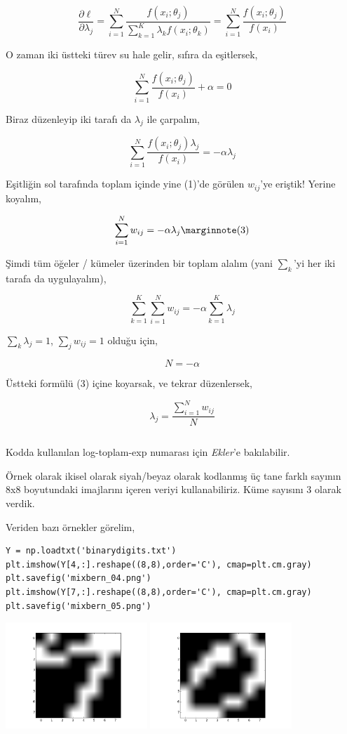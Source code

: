 \documentclass[12pt,fleqn]{article}\usepackage{../../common}
\begin{document}
$$ 
\frac{\partial \ell}{\partial \lambda_j}  = 
\sum_{i=1}^{N}
\frac{f(x_i;\theta_j)}{\sum_{k=1}^{K} \lambda_k f(x_i;\theta_k) }
=
\sum_{i=1}^{N}
\frac{f(x_i;\theta_j)}{f(x_i) }
$$

O zaman iki üstteki türev su hale gelir, sıfıra da eşitlersek,

$$  
\sum_{i=1}^{N} \frac{f(x_i;\theta_j)}{f(x_i) } + \alpha = 0
$$

Biraz düzenleyip iki tarafı da $\lambda_j$ ile çarpalım,

$$
\sum_{i=1}^{N} \frac{f(x_i;\theta_j) \lambda_j}{f(x_i) } = - \alpha \lambda_j 
$$

Eşitliğin sol tarafında toplam içinde yine (1)'de görülen $w_{ij}$'ye eriştik!
Yerine koyalım,

$$
\sum_{i=1}^{N} w_{ij} = - \alpha \lambda_j 
\mlabel{3} 
$$

Şimdi tüm öğeler / kümeler üzerinden bir toplam alalım (yani $\sum_k$'yi her iki
tarafa da uygulayalım),

$$
\sum_{k=1}^{K} \sum_{i=1}^{N} w_{ij} = - \alpha  \sum_{k=1}^{K} \lambda_j
$$


$ \sum_k \lambda_j = 1 $, $\sum_j w_{ij} = 1 $ olduğu için,

$$ 
N = - \alpha 
$$

Üstteki formülü (3) içine koyarsak, ve tekrar düzenlersek,

$$ 
\lambda_j = \frac{\sum_{i=1}^{N} w_{ij}}{N} 
$$

\inputminted[fontsize=\footnotesize]{python}{mixbern.py}

Kodda kullanılan log-toplam-exp numarası için {\em Ekler}'e bakılabilir.

Örnek olarak ikisel olarak siyah/beyaz olarak kodlanmış üç tane farklı sayının
8x8 boyutundaki imajlarını içeren veriyi kullanabiliriz. Küme sayısını 3 olarak
verdik.

Veriden bazı örnekler görelim,

\begin{verbatim}
Y = np.loadtxt('binarydigits.txt')
plt.imshow(Y[4,:].reshape((8,8),order='C'), cmap=plt.cm.gray)
plt.savefig('mixbern_04.png')
plt.imshow(Y[7,:].reshape((8,8),order='C'), cmap=plt.cm.gray)
plt.savefig('mixbern_05.png')
\end{verbatim}

\includegraphics[height=4cm]{mixbern_04.png}
\includegraphics[height=4cm]{mixbern_05.png}
\end{document}
